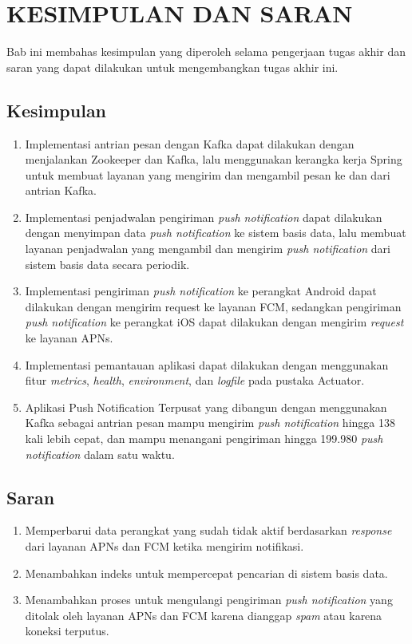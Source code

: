 \chapter{KESIMPULAN DAN SARAN}
\par Bab ini membahas kesimpulan yang diperoleh selama pengerjaan tugas akhir dan saran yang dapat dilakukan untuk mengembangkan tugas akhir ini.

\section{Kesimpulan}
\begin{enumerate}
	\item Implementasi antrian pesan dengan Kafka dapat dilakukan dengan menjalankan Zookeeper dan Kafka, lalu menggunakan kerangka kerja Spring untuk membuat layanan yang mengirim dan mengambil pesan ke dan dari antrian Kafka.
	\item Implementasi penjadwalan pengiriman \textit{push notification} dapat dilakukan dengan menyimpan data \textit{push notification} ke sistem basis data, lalu membuat layanan penjadwalan yang mengambil dan mengirim \textit{push notification} dari sistem basis data secara periodik.
	\item Implementasi pengiriman \textit{push notification} ke perangkat Android dapat dilakukan dengan mengirim request ke layanan FCM, sedangkan pengiriman \textit{push notification} ke perangkat iOS dapat dilakukan dengan mengirim \textit{request} ke layanan APNs.
	\item Implementasi pemantauan aplikasi dapat dilakukan dengan menggunakan fitur \textit{metrics}, \textit{health}, \textit{environment}, dan \textit{logfile} pada pustaka Actuator.
	\item Aplikasi Push Notification Terpusat yang dibangun dengan menggunakan Kafka sebagai antrian pesan mampu mengirim \textit{push notification} hingga 138 kali lebih cepat, dan mampu menangani pengiriman hingga 199.980 \textit{push notification} dalam satu waktu.
\end{enumerate}

\section{Saran}
\begin{enumerate}
    \item Memperbarui data perangkat yang sudah tidak aktif berdasarkan \textit{response} dari layanan APNs dan FCM ketika mengirim notifikasi.
    \item Menambahkan indeks untuk mempercepat pencarian di sistem basis data.
    \item Menambahkan proses untuk mengulangi pengiriman \textit{push notification} yang ditolak oleh layanan APNs dan FCM karena dianggap \textit{spam} atau karena koneksi terputus.
\end{enumerate}
